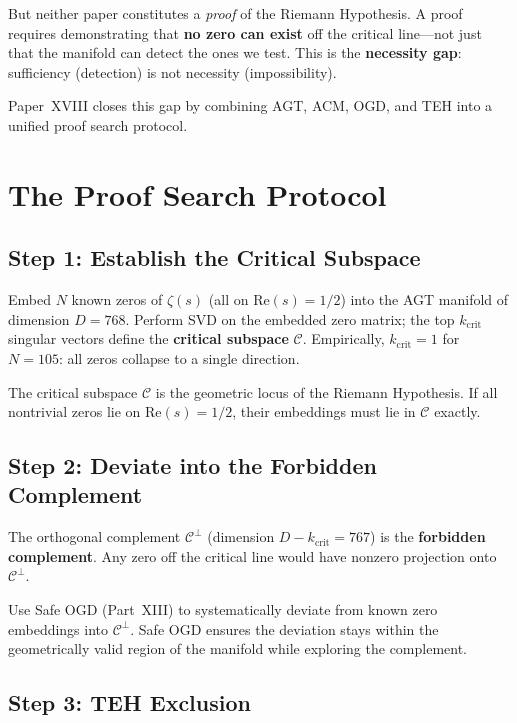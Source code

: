 \documentclass{article}
\begin{document}
But neither paper constitutes a \emph{proof} of the Riemann Hypothesis.  A
proof requires demonstrating that \textbf{no zero can exist} off the critical
line---not just that the manifold can detect the ones we test.  This is the
\textbf{necessity gap}: sufficiency (detection) is not necessity (impossibility).

Paper~XVIII closes this gap by combining AGT, ACM, OGD, and TEH into a unified
proof search protocol.

\section{The Proof Search Protocol}
\label{sec:protocol}

\subsection{Step 1: Establish the Critical Subspace}

Embed $N$ known zeros of $\zeta(s)$ (all on $\mathrm{Re}(s) = 1/2$) into the
AGT manifold of dimension $D=768$.  Perform SVD on the embedded zero matrix;
the top $k_{\mathrm{crit}}$ singular vectors define the \textbf{critical
subspace} $\mathcal{C}$.  Empirically, $k_{\mathrm{crit}} = 1$ for $N = 105$:
all zeros collapse to a single direction.

The critical subspace $\mathcal{C}$ is the geometric locus of the Riemann
Hypothesis.  If all nontrivial zeros lie on $\mathrm{Re}(s) = 1/2$, their
embeddings must lie in $\mathcal{C}$ exactly.

\subsection{Step 2: Deviate into the Forbidden Complement}

The orthogonal complement $\mathcal{C}^\perp$ (dimension $D - k_{\mathrm{crit}}
= 767$) is the \textbf{forbidden complement}.  Any zero off the critical line
would have nonzero projection onto $\mathcal{C}^\perp$.

Use Safe OGD (Part~XIII) to systematically deviate from known zero embeddings
into $\mathcal{C}^\perp$.  Safe OGD ensures the deviation stays within the
geometrically valid region of the manifold while exploring the complement.

\subsection{Step 3: TEH Exclusion}
\end{document}
